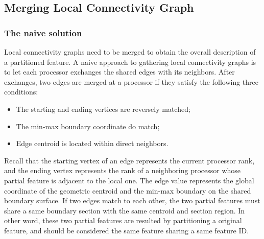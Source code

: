 \documentclass[10pt, conference, compsocconf]{IEEEtran}
\begin{document}
\subsection{Merging Local Connectivity Graph}

\subsubsection{The naive solution}

Local connectivity graphs need to be merged to obtain the overall description of a partitioned feature. A naive approach to gathering local connectivity graphs is to let each processor exchanges the shared edges with its neighbors. After exchanges, two edges are merged at a processor if they satisfy the following three conditions:

\begin{itemize}
\item The starting and ending vertices are reversely matched;
\item The min-max boundary coordinate do match;
\item Edge centroid is located within direct neighbors.
\end{itemize}

Recall that the starting vertex of an edge represents the current processor rank, and the ending vertex represents the rank of a neighboring processor whose partial feature is adjacent to the local one. The edge value represents the global coordinate of the geometric centroid and the min-max boundary on the shared boundary surface. If two edges match to each other, the two partial features must share a same boundary section with the same centroid and section region. In other word, these two partial features are resulted by partitioning a original feature, and should be considered the same feature sharing a same feature ID.
\end{document}
